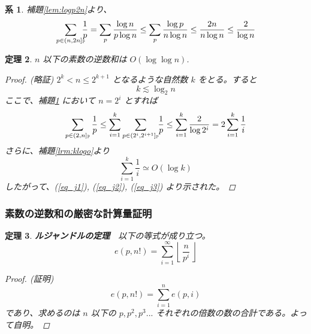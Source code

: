 \documentclass[12pt, a4j]{ltjsarticle}
\newtheorem{thm}{定理}
\newtheorem{cor}[thm]{系}
\begin{document}
\vspace{1cm}

\begin{cor} 補題\ref{lem:logp2n}より、\label{cor:logppp}
\begin{equation}
\sum_{p \in(n,2n]_\mathbb{P}} \hspace{-2mm}\frac{1}{p}=\sum_p\frac{\log n}{p\log n}\le\sum_p\frac{\log p}{n\log n}\le \frac{2n}{n \log n} \le \frac{2}{\log n}
\end{equation}
\end{cor}

\vspace{1cm}

\begin{thm}
$n$ 以下の素数の逆数和は $O(\log\log n)$. \label{easy}
\begin{proof}(略証) $2^k<n\le2^{k+1}$ となるような自然数 $k$ をとる。すると
\begin{equation}
  k\lesssim \log_2n \label{eq_j1}
\end{equation} ここで、補題\ref{cor:logppp} において $n=2^i$ とすれば
\begin{equation}\label{eq_j2}
\sum_{p\in (2,n]_\mathbb{P}}\frac{1}{p} \le \sum_{i=1}^k\sum_{p\in(2^i,2^{i+1}]_\mathbb{P}}\hspace{-1mm}\frac{1}{p} \le \sum_{i=1}^k \frac{2}{\log 2^i}= 2\sum_{i=1}^k\frac{1}{i}
\end{equation}
さらに、補題\ref{lrm:klogo}より
\begin{equation}\label{eq_j3}
\sum_{i=1}^k\frac{1}{i} \simeq O(\log k)
\end{equation}
したがって、(\ref{eq_j1}), (\ref{eq_j2}), (\ref{eq_j3}) より示された。
\end{proof}
\end{thm}

\newpage
\subsubsection{素数の逆数和の厳密な計算量証明}
\begin{thm} {\bf ルジャンドルの定理}\label{ルジャンドルの定理} 　以下の等式が成り立つ。
\begin{equation}
e(p,n!) = \sum_{i=1}^\infty \left\lfloor\, \frac{n}{p^i} \,\right\rfloor
\end{equation}

\begin{proof}
(証明) \begin{equation}e(p,n!) = \sum_{i=1}^n e(p,i)\end{equation}
\setlength{\leftskip}{1.0cm} であり、求めるのは $n$ 以下の $p, p^2,p^3...$ それぞれの倍数の数の合計である。よって自明。
\end{proof}
\end{thm}
\end{document}
